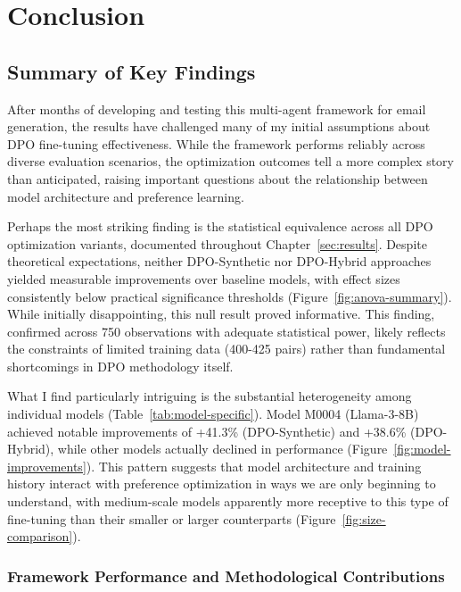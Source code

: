 \chapter{Conclusion}
\label{sec:conclusion}

\section{Summary of Key Findings}
\label{sec:key-findings}

After months of developing and testing this multi-agent framework for email generation, the results have challenged many of my initial assumptions about DPO fine-tuning effectiveness. While the framework performs reliably across diverse evaluation scenarios, the optimization outcomes tell a more complex story than anticipated, raising important questions about the relationship between model architecture and preference learning.

Perhaps the most striking finding is the statistical equivalence across all DPO optimization variants, documented throughout Chapter~\ref{sec:results}. Despite theoretical expectations, neither DPO-Synthetic nor DPO-Hybrid approaches yielded measurable improvements over baseline models, with effect sizes consistently below practical significance thresholds (Figure~\ref{fig:anova-summary}). While initially disappointing, this null result proved informative. This finding, confirmed across 750 observations with adequate statistical power, likely reflects the constraints of limited training data (400-425 pairs) rather than fundamental shortcomings in DPO methodology itself.

What I find particularly intriguing is the substantial heterogeneity among individual models (Table~\ref{tab:model-specific}). Model M0004 (Llama-3-8B) achieved notable improvements of +41.3\% (DPO-Synthetic) and +38.6\% (DPO-Hybrid), while other models actually declined in performance (Figure~\ref{fig:model-improvements}). This pattern suggests that model architecture and training history interact with preference optimization in ways we are only beginning to understand, with medium-scale models apparently more receptive to this type of fine-tuning than their smaller or larger counterparts (Figure~\ref{fig:size-comparison}).

\subsection{Framework Performance and Methodological Contributions}

